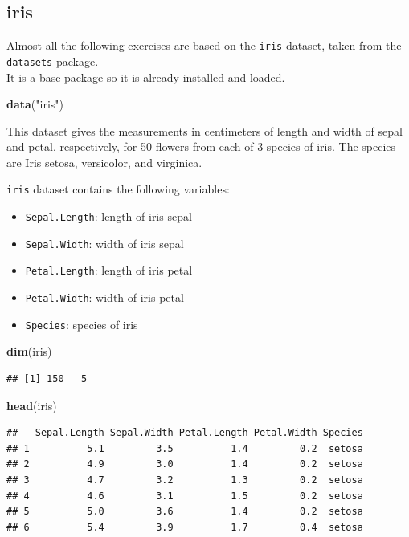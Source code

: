 \documentclass[]{book}
\newenvironment{Shaded}{\begin{snugshade}}{\end{snugshade}}
\newcommand{\KeywordTok}[1]{\textcolor[rgb]{0.13,0.29,0.53}{\textbf{{#1}}}}
\newcommand{\StringTok}[1]{\textcolor[rgb]{0.31,0.60,0.02}{{#1}}}
\newcommand{\NormalTok}[1]{{#1}}
\providecommand{\tightlist}{%
  \setlength{\itemsep}{0pt}\setlength{\parskip}{0pt}}
\def\tightlist{}
\begin{document}
\subsection{iris}\label{iris}

Almost all the following exercises are based on the \texttt{iris}
dataset, taken from the \texttt{datasets} package.\\
It is a base package so it is already installed and loaded.

\begin{Shaded}
\begin{Highlighting}[]
\KeywordTok{data}\NormalTok{(}\StringTok{"iris"}\NormalTok{)}
\end{Highlighting}
\end{Shaded}

This dataset gives the measurements in centimeters of length and width
of sepal and petal, respectively, for 50 flowers from each of 3 species
of iris. The species are Iris setosa, versicolor, and virginica.

\texttt{iris} dataset contains the following variables:

\begin{itemize}
\tightlist
\item
  \texttt{Sepal.Length}: length of iris sepal
\item
  \texttt{Sepal.Width}: width of iris sepal
\item
  \texttt{Petal.Length}: length of iris petal
\item
  \texttt{Petal.Width}: width of iris petal
\item
  \texttt{Species}: species of iris
\end{itemize}

\begin{Shaded}
\begin{Highlighting}[]
\KeywordTok{dim}\NormalTok{(iris)}
\end{Highlighting}
\end{Shaded}

\begin{verbatim}
## [1] 150   5
\end{verbatim}

\begin{Shaded}
\begin{Highlighting}[]
\KeywordTok{head}\NormalTok{(iris)}
\end{Highlighting}
\end{Shaded}

\begin{verbatim}
##   Sepal.Length Sepal.Width Petal.Length Petal.Width Species
## 1          5.1         3.5          1.4         0.2  setosa
## 2          4.9         3.0          1.4         0.2  setosa
## 3          4.7         3.2          1.3         0.2  setosa
## 4          4.6         3.1          1.5         0.2  setosa
## 5          5.0         3.6          1.4         0.2  setosa
## 6          5.4         3.9          1.7         0.4  setosa
\end{verbatim}
\end{document}
